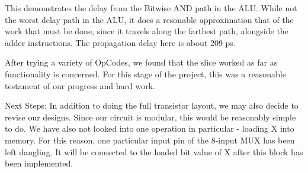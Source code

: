 \documentclass[12pt]{article}
\begin{document}
  This demonstrates the delay from the Bitwise AND path in the ALU. While not the worst delay
  path in the ALU, it does a resonable approximation that of the work that must be done, since
  it travels along the farthest path, alongside the adder instructions. The propagation delay
  here is about 209 ps.
	
	After trying a variety of OpCodes, we found that the slice worked as far as functionality 
	is concerned. For this stage of the project, this was a reasonable testament of our progress
	and hard work.
	
	Next Steps:
	In addition to doing the full transistor layout, we may also decide to revise our designs. Since
	our circuit is modular, this would be reasonably simple to do. We have also not looked into
	one operation in particular - loading X into memory. For this reason, one particular input pin 
	of the 8-input MUX has been left dangling. It will be connected to the loaded bit value of
	X after this block has been implemented. 
\end{document}
